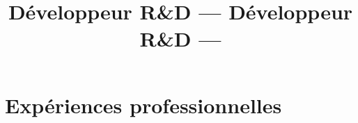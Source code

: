 \documentclass[11pt,a4paper]{moderncv}
\title{Développeur R\&D  \newline --- \newline \newline Développeur R\&D \newline ---}
\begin{document}
\maketitle


\section{Expériences professionnelles}
\end{document}
